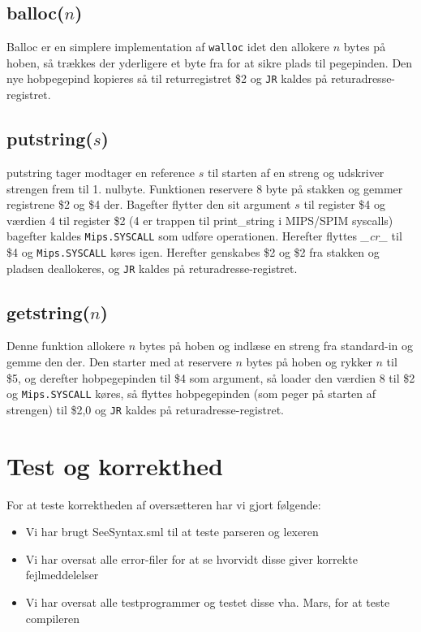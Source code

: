 \documentclass[a4paper, 10pt]{article}
\begin{document}
\subsection{balloc($n$)}
Balloc er en simplere implementation af \texttt{walloc} idet den allokere $n$ bytes på hoben, så trækkes der yderligere et byte fra for at sikre plads til pegepinden. Den nye hobpegepind kopieres så til returregistret \$2 og \texttt{JR} kaldes på returadresse-registret.

\subsection{putstring($s$)}
putstring tager modtager en reference $s$ til starten af en streng og udskriver strengen frem til 1. nulbyte. Funktionen reservere 8 byte på stakken og gemmer registrene \$2 og \$4 der. Bagefter flytter den sit argument $s$ til register \$4 og værdien 4 til register \$2 (4 er trappen til print_string i MIPS/SPIM syscalls) bagefter kaldes \texttt{Mips.SYSCALL} som udføre operationen. Herefter flyttes \textit{_cr_} til \$4 og \texttt{Mips.SYSCALL} køres igen. Herefter genskabes \$2 og \$2 fra stakken og pladsen deallokeres, og \texttt{JR} kaldes på returadresse-registret.

\subsection{getstring($n$)}
Denne funktion allokere $n$ bytes på hoben og indlæse en streng fra standard-in og gemme den der.
Den starter med at reservere $n$ bytes på hoben og rykker $n$ til \$5, og derefter hobpegepinden til \$4 som argument, så loader den værdien 8 til \$2 og \texttt{Mips.SYSCALL} køres, så flyttes hobpegepinden (som peger på starten af strengen) til \$2,0 og \texttt{JR} kaldes på returadresse-registret.


\section{Test og korrekthed}
For at teste korrektheden af oversætteren har vi gjort følgende:
\begin{itemize}
\item Vi har brugt SeeSyntax.sml til at teste parseren og lexeren
\item Vi har oversat alle error-filer for at se hvorvidt disse giver korrekte fejlmeddelelser
\item Vi har oversat alle testprogrammer og testet disse vha. Mars, for at teste compileren
\end{itemize}
\end{document}
